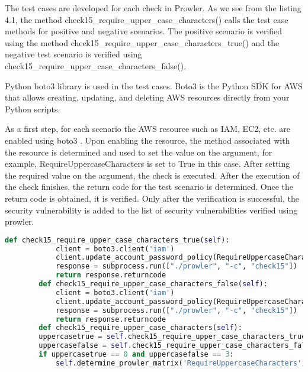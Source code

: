 \par The test cases are developed for each check in Prowler.
As we see from the listing
4.1, the method check15\_require\_upper\_case\_characters() calls the test case methods
for positive and negative scenarios.
The positive scenario is verified using the method
check15\_require\_upper\_case\_characters\_true() and the negative test scenario is verified
using check15\_require\_upper\_case\_characters\_false().

\par Python boto3 \cite{76} library is used in the test
cases.
Boto3 is the Python SDK for AWS
that allows creating, updating, and deleting AWS resources directly from your Python
scripts.

\par As a first step, for each scenario the AWS resource
such as IAM, EC2, etc. are enabled using boto3 \cite{76}.
Upon enabling the resource, the method associated with the resource is determined and used to set the value on the argument, for example, RequireUppercaseCharacters is set to True in this case. After setting the required value on the argument, the check is executed. After the execution of the check finishes, the return code for the test scenario is determined. Once the return code is obtained, it is verified. Only after the verification is successful, the security vulnerability is added to the list of security vulnerabilities verified using prowler.


\lstset{frame=lines}
\lstset{basicstyle=\footnotesize\ttfamily}

\begin{lstlisting}[language=Python]
	def check15_require_upper_case_characters_true(self):
            client = boto3.client('iam')
            client.update_account_password_policy(RequireUppercaseCharacters=True)
            response = subprocess.run(["./prowler", "-c", "check15"])
            return response.returncode
        def check15_require_upper_case_characters_false(self):
            client = boto3.client('iam')
            client.update_account_password_policy(RequireUppercaseCharacters=False)
            response = subprocess.run(["./prowler", "-c", "check15"])
            return response.returncode
        def check15_require_upper_case_characters(self):
	    uppercasetrue = self.check15_require_upper_case_characters_true()
	    uppercasefalse = self.check15_require_upper_case_characters_false()
	    if uppercasetrue == 0 and uppercasefalse == 3:
	        self.determine_prowler_matrix('RequireUppercaseCharacters')
\end{lstlisting}


